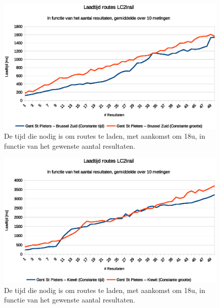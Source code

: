 \begin{figure}[h]
	\centering
	\includegraphics[width=1.00\textwidth]{images/Laadtijd_routes_Gent-St-Pieters_Brussel-Zuid.eps}

	\caption[Laadtijd routes tussen Gent en Brussel in functie van aantal resultaten]{De tijd die nodig is om routes te laden, met aankomst om 18u, in functie van het gewenste aantal resultaten.}
\label{fig:responsetimeperresultsrouteBruSouth}
\end{figure}

\begin{figure}[h]
	\centering
	\includegraphics[width=1.00\textwidth]{images/Laadtijd_routes_Gent-St-Pieters_Kiewit.eps}	\caption[Laadtijd van routes tussen Gent en Kiewit in functie van aantal resultaten]{De tijd die nodig is om routes te laden, met aankomst om 18u, in functie van het gewenste aantal resultaten.}
	\label{fig:responsetimeperresultsrouteKiewit}
\end{figure}

